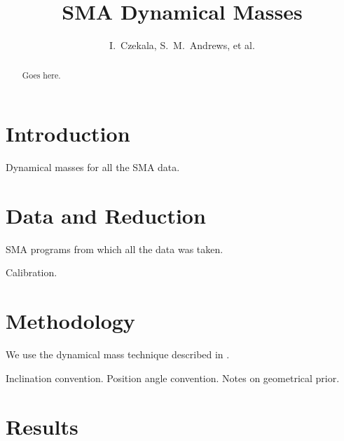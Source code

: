 \documentclass[iop,floatfix,numberedappendix,twocolappendix]{emulateapj}
\begin{document}
\title{SMA Dynamical Masses}
\author{I.~Czekala, S.~M.~Andrews, et al.}

\begin{abstract}
Goes here.
\end{abstract}


\section{Introduction}

Dynamical masses for all the SMA data.

\section{Data and Reduction}

SMA programs from which all the data was taken.

Calibration.

\section{Methodology}

We use the dynamical mass technique described in \citet{czekala15a}.

Inclination convention. Position angle convention. Notes on geometrical prior.

\section{Results}
\end{document}
